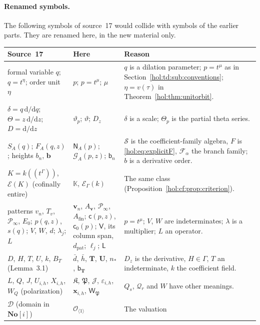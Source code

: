 \documentclass[11pt]{article}
\numberwithin{equation}{section}
\theoremstyle{definition}
\theoremstyle{remark}
\newcommand{\No}{\mathbf{No}}
\newcommand{\KK}{\mathbb K}
\newcommand{\EK}{\mathcal E_\Gamma(k)}
\newcommand{\Sfam}{\mathcal S}
\begin{document}
\paragraph{Renamed symbols.}
The following symbols of source~17 would collide with symbols of the earlier
parts. They are renamed here, in the new material only.
{\small
\begin{longtable}{@{}>{\raggedright\arraybackslash}p{}
>{\raggedright\arraybackslash}p{}
>{\raggedright\arraybackslash}p{}@{}}
\toprule
Source~17 & Here & Reason\\
\midrule
\endhead
formal variable $q$; $q=t^\eta$; order unit $\eta$ & $p$; $p=t^\mu$; $\mu$ &
$q$ is a dilation parameter; $p=t^\mu$ as in
Section~\ref{hol:td:sub:conventions}; $\eta=v(\tau)$ in
Theorem~\ref{hol:thm:unitorbit}.\\
$\delta=q\,\mathrm d/\mathrm dq$; $\Theta=z\,\mathrm d/\mathrm dz$;
$D=\mathrm d/\mathrm dz$ & $\vartheta_p$; $\vartheta$; $D_z$ & $\delta$ is a
scale; $\Theta_p$ is the partial theta series.\\
$S_A(q)$; $F_A(q,z)$; heights $b_n$, $\boldsymbol b$ & $\mathsf N_A(p)$;
$\mathcal G_A(p,z)$; $\mathsf b_n$ & $\Sfam$ is the coefficient-family
algebra, $F$ is \eqref{hol:eq:explicitF}, $\mathcal F_\alpha$ the branch
family; $b$ is a derivative order.\\
$K=k((t^\Gamma))$, $\mathcal E(K)$ (cofinally entire) & $\KK$, $\EK$ & The same
class (Proposition~\ref{hol:cf:prop:criterion}).\\
patterns $v_n$, $T_v$, $\mathcal P_\infty$, $E_0$; $p(q,z)$, $s(q)$; $V$, $W$,
$d$; $\lambda_j$; $L$ & $\mathbf v_n$, $A_{\mathbf v}$, $\mathcal P_\infty$,
$A_{\mathrm{fin}}$; $\mathsf c(p,z)$, $\mathsf c_0(p)$; $\mathsf V$, its column
span, $d_{\mathrm{pat}}$; $\boldsymbol\ell_j$; $\mathsf L$ & $p=t^\mu$;
$V$, $W$ are indeterminates; $\lambda$ is a multiplier; $L$ an operator.\\
$D$, $H$, $T$, $U$, $k$, $B_T$ (Lemma~3.1) & $\bar d$, $\bar h$, $\mathbf T$,
$\mathbf U$, $n_*$, $\mathsf b_{\mathbf T}$ & $D_z$ is the derivative, $H\in\Gamma$,
$T$ an indeterminate, $k$ the coefficient field.\\
$L$, $Q$, $J$, $U_{i,h}$, $X_{i,h}$, $W_Q$ (polarization) & $\mathfrak K$,
$\mathfrak P$, $\mathcal J$, $\varepsilon_{i,h}$, $\mathbf x_{i,h}$,
$\mathsf W_{\mathfrak P}$ & $Q_s$, $\mathcal Q_r$ and $W$ have other
meanings.\\
$\mathcal D$ (domain in $\No[i]$) & $\mathcal O_{\langle1\rangle}$ & The valuation

\end{longtable}}
\end{document}
